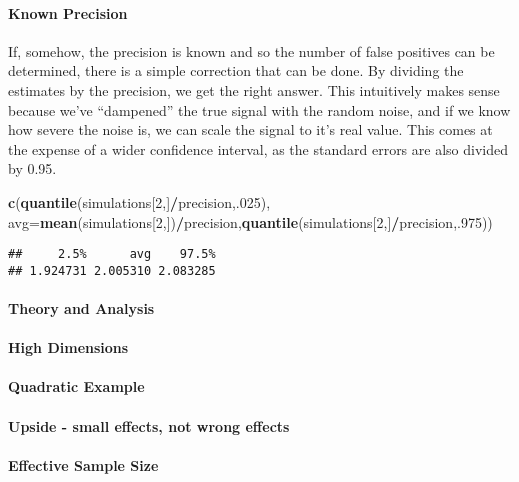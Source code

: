 \documentclass[
]{article}
\newenvironment{Shaded}{\begin{snugshade}}{\end{snugshade}}
\newcommand{\DataTypeTok}[1]{\textcolor[rgb]{0.13,0.29,0.53}{#1}}
\newcommand{\DecValTok}[1]{\textcolor[rgb]{0.00,0.00,0.81}{#1}}
\newcommand{\KeywordTok}[1]{\textcolor[rgb]{0.13,0.29,0.53}{\textbf{#1}}}
\newcommand{\NormalTok}[1]{#1}
\newcommand{\OperatorTok}[1]{\textcolor[rgb]{0.81,0.36,0.00}{\textbf{#1}}}
\begin{document}
\hypertarget{known-precision}{%
\paragraph{Known Precision}\label{known-precision}}

If, somehow, the precision is known and so the number of false positives
can be determined, there is a simple correction that can be done. By
dividing the estimates by the precision, we get the right answer. This
intuitively makes sense because we've ``dampened'' the true signal with
the random noise, and if we know how severe the noise is, we can scale
the signal to it's real value. This comes at the expense of a wider
confidence interval, as the standard errors are also divided by 0.95.

\begin{Shaded}
\begin{Highlighting}[]
\KeywordTok{c}\NormalTok{(}\KeywordTok{quantile}\NormalTok{(simulations[}\DecValTok{2}\NormalTok{,]}\OperatorTok{/}\NormalTok{precision,.}\DecValTok{025}\NormalTok{), }\DataTypeTok{avg=}\KeywordTok{mean}\NormalTok{(simulations[}\DecValTok{2}\NormalTok{,])}\OperatorTok{/}\NormalTok{precision,}\KeywordTok{quantile}\NormalTok{(simulations[}\DecValTok{2}\NormalTok{,]}\OperatorTok{/}\NormalTok{precision,.}\DecValTok{975}\NormalTok{))}
\end{Highlighting}
\end{Shaded}

\begin{verbatim}
##     2.5%      avg    97.5% 
## 1.924731 2.005310 2.083285
\end{verbatim}

\hypertarget{theory-and-analysis}{%
\paragraph{Theory and Analysis}\label{theory-and-analysis}}

\hypertarget{high-dimensions}{%
\paragraph{High Dimensions}\label{high-dimensions}}

\hypertarget{quadratic-example}{%
\paragraph{Quadratic Example}\label{quadratic-example}}

\hypertarget{upside---small-effects-not-wrong-effects}{%
\paragraph{Upside - small effects, not wrong
effects}\label{upside---small-effects-not-wrong-effects}}

\hypertarget{effective-sample-size}{%
\paragraph{Effective Sample Size}\label{effective-sample-size}}
\end{document}
